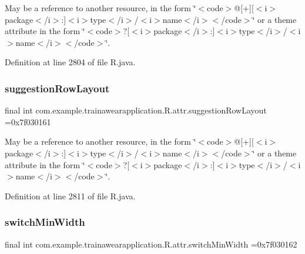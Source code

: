 May be a reference to another resource, in the form \char`\"{}$<$code$>$@\mbox{[}+\mbox{]}\mbox{[}$<$i$>$package$<$/i$>$\+:\mbox{]}$<$i$>$type$<$/i$>$/$<$i$>$name$<$/i$>$$<$/code$>$\char`\"{} or a theme attribute in the form \char`\"{}$<$code$>$?\mbox{[}$<$i$>$package$<$/i$>$\+:\mbox{]}$<$i$>$type$<$/i$>$/$<$i$>$name$<$/i$>$$<$/code$>$\char`\"{}. 

Definition at line 2804 of file R.\+java.

\mbox{\label{classcom_1_1example_1_1trainawearapplication_1_1_r_1_1attr_a6dfcfc2d7f1cfb70885927ff8c0d032e}} 
\subsubsection{\texorpdfstring{suggestionRowLayout}{suggestionRowLayout}}
{\footnotesize\ttfamily final int com.\+example.\+trainawearapplication.\+R.\+attr.\+suggestion\+Row\+Layout =0x7f030161\hspace{0.3cm}{\ttfamily [static]}}

May be a reference to another resource, in the form \char`\"{}$<$code$>$@\mbox{[}+\mbox{]}\mbox{[}$<$i$>$package$<$/i$>$\+:\mbox{]}$<$i$>$type$<$/i$>$/$<$i$>$name$<$/i$>$$<$/code$>$\char`\"{} or a theme attribute in the form \char`\"{}$<$code$>$?\mbox{[}$<$i$>$package$<$/i$>$\+:\mbox{]}$<$i$>$type$<$/i$>$/$<$i$>$name$<$/i$>$$<$/code$>$\char`\"{}. 

Definition at line 2811 of file R.\+java.

\mbox{\label{classcom_1_1example_1_1trainawearapplication_1_1_r_1_1attr_afa519be5736b8263e258b0ecc502a542}} 
\subsubsection{\texorpdfstring{switchMinWidth}{switchMinWidth}}
{\footnotesize\ttfamily final int com.\+example.\+trainawearapplication.\+R.\+attr.\+switch\+Min\+Width =0x7f030162\hspace{0.3cm}{\ttfamily [static]}}

